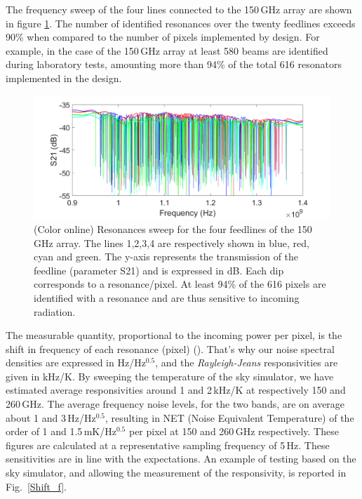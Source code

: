 \documentclass[]{aa} %
\begin{document}
The frequency sweep of the four lines connected to the 150\,GHz array are shown in figure \ref{VNA}. The number of identified resonances over the twenty feedlines exceeds 90\% when compared to the number of pixels implemented by design. For example, in the case of the 150\,GHz array at least 580 beams are identified during laboratory tests, amounting more than 94\% of the total 616 resonators implemented in the design. 

\begin{figure}[h]
\begin{center}
   \centering
    \includegraphics[width=1.0\linewidth]{VNA_scans_150GHz.png}
    \caption{(Color online) Resonances sweep for the four feedlines of the 150\,GHz array. The lines 1,2,3,4 are respectively shown in blue, red, cyan and green. The y-axis represents the transmission of the feedline (parameter S21) and is expressed in dB. Each dip corresponds to a resonance/pixel. At least 94\% of the 616 pixels are identified with a resonance and are thus sensitive to incoming radiation.}
         \label{VNA}
\end{center}
\end{figure}

The measurable quantity, proportional to the incoming power per pixel, is the shift in frequency of each resonance (pixel) (\cite{Swenson2010}). That's why our noise spectral densities are expressed in Hz/Hz$^{0.5}$, and the \textit{Rayleigh-Jeans} responsivities are given in kHz/K. By sweeping the temperature of the sky simulator, we have estimated average responsivities around 1 and 2\,kHz/K at respectively 150 and 260\,GHz. The average frequency noise levels, for the two bands, are on average about 1 and 3\,Hz/Hz$^{0.5}$, resulting in NET (Noise Equivalent Temperature) of the order of 1 and 1.5\,mK/Hz$^{0.5}$ per pixel at 150 and 260\,GHz respectively. These figures are calculated at a representative sampling frequency of 5\,Hz. 
These sensitivities are in line with the expectations. An example of testing based on the sky simulator, and allowing the measurement of the responsivity, is reported in Fig.~\ref{Shift_f}. 
\end{document}
